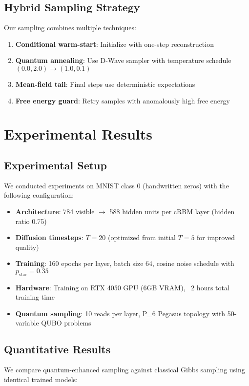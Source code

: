 \documentclass[11pt]{article}
\begin{document}
\subsection{Hybrid Sampling Strategy}
Our sampling combines multiple techniques:
\begin{enumerate}
    \item \textbf{Conditional warm-start}: Initialize with one-step reconstruction
    \item \textbf{Quantum annealing}: Use D-Wave sampler with temperature schedule $(0.0, 2.0) \to (1.0, 0.1)$
    \item \textbf{Mean-field tail}: Final steps use deterministic expectations
    \item \textbf{Free energy guard}: Retry samples with anomalously high free energy
\end{enumerate}

\section{Experimental Results}

\subsection{Experimental Setup}
We conducted experiments on MNIST class 0 (handwritten zeros) with the following configuration:
\begin{itemize}
    \item \textbf{Architecture}: 784 visible $\to$ 588 hidden units per cRBM layer (hidden ratio 0.75)
    \item \textbf{Diffusion timesteps}: $T=20$ (optimized from initial $T=5$ for improved quality)
    \item \textbf{Training}: 160 epochs per layer, batch size 64, cosine noise schedule with $p_{\text{star}} = 0.35$
    \item \textbf{Hardware}: Training on RTX 4050 GPU (6GB VRAM), ~2 hours total training time
    \item \textbf{Quantum sampling}: 10 reads per layer, P_6 Pegasus topology with 50-variable QUBO problems
\end{itemize}

\subsection{Quantitative Results}
We compare quantum-enhanced sampling against classical Gibbs sampling using identical trained models:
\end{document}
